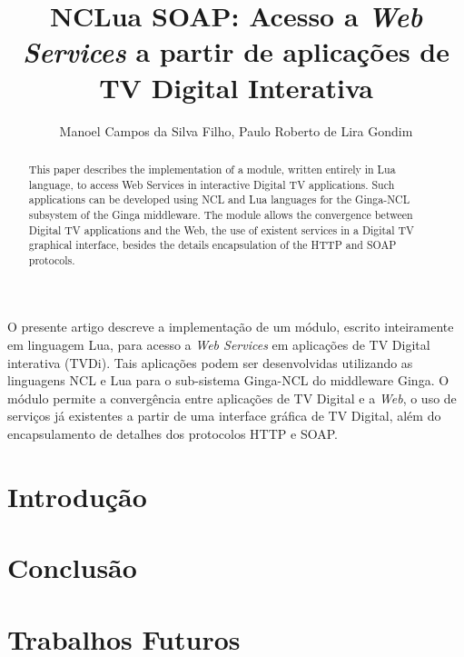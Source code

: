\documentclass[12pt]{article}
\title{NCLua SOAP: Acesso a \textit{Web Services} a partir de aplicações de TV Digital Interativa}
\author{Manoel Campos da Silva Filho\inst{1}, Paulo Roberto de Lira Gondim\inst{2}}
\begin{document}
 

\maketitle

\begin{abstract}
This paper describes the implementation of a module, written entirely in Lua language, to access Web Services in interactive Digital TV applications. Such applications can be developed using NCL and Lua languages for the Ginga-NCL subsystem 
of the Ginga middleware. 
The module allows the convergence between Digital TV applications and the Web, 
the use of existent services in a Digital TV graphical interface, 
besides the details encapsulation of the HTTP and SOAP protocols.
\end{abstract}
     
\begin{resumo} 
O presente artigo descreve a implementação de um módulo, escrito inteiramente em linguagem Lua,
para acesso a \textit{Web Services} em aplicações de TV Digital interativa (TVDi). Tais aplicações
podem ser desenvolvidas utilizando as linguagens NCL e Lua para o sub-sistema
Ginga-NCL do middleware Ginga. O módulo permite a convergência entre aplicações de TV Digital e a \textit{Web}, o
uso de serviços já existentes a partir de uma interface gráfica de TV Digital, além
do encapsulamento de detalhes dos protocolos HTTP e SOAP.
\end{resumo}

\section{Introdução} \label{sec:introducao}



\section{Conclusão} \label{sec:conclusao}

\section{Trabalhos Futuros} \label{sec:trabalhos-futuros}




\end{document}
